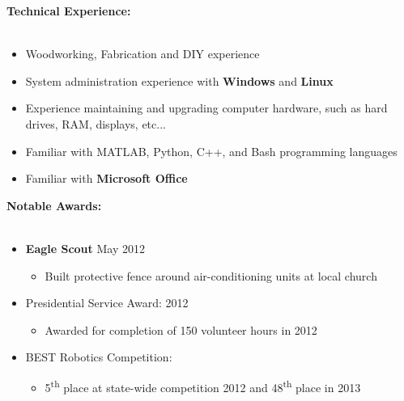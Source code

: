 \documentclass[12pt]{article}
\begin{document}
\begin{flushleft}
\textbf{Technical Experience:}\\
\vspace{-11pt}\hrulefill\\\vspace{-1.1mm}
\begin{itemize}\vspace{-0mm}
\item Woodworking, Fabrication and DIY experience
\item System administration experience with \textbf{Windows} and \textbf{Linux}
\item Experience maintaining and upgrading computer hardware, such as hard drives, RAM, displays, etc...
\item Familiar with MATLAB, Python, C++, and Bash programming languages
\item Familiar with \textbf{Microsoft Office}
\end{itemize}

\textbf{Notable Awards:}\\
\vspace{-11pt}\hrulefill\\\vspace{-1.1mm}
\begin{itemize}\vspace{-0.3mm}
\item \textbf{Eagle Scout} \hfill May 2012\\
	\begin{itemize}\vspace{-1mm}
	\item Built protective fence around air-conditioning units at local church
	\end{itemize}\vspace{-1mm}
\item Presidential Service Award: \hfill 2012\\
	\begin{itemize}\vspace{-0mm}
	\item Awarded for completion of 150 volunteer hours in 2012
	\end{itemize}\vspace{-1mm}
\item BEST Robotics Competition:
	\begin{itemize}\vspace{-0mm}
	\item 5\textsuperscript{th} place at state-wide competition 2012 and 48\textsuperscript{th} place in 2013
	\end{itemize}\vspace{-1mm}
\end{itemize}

\end{flushleft}
\end{document}
